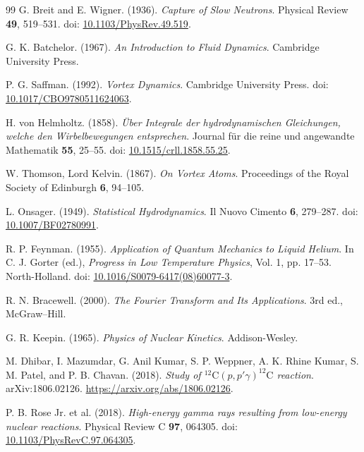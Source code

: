 \begin{thebibliography}{99}
        G. Breit and E. Wigner. (1936).
        \textit{Capture of Slow Neutrons}.
        Physical Review \textbf{49}, 519--531.
        doi: \href{https://doi.org/10.1103/PhysRev.49.519}{10.1103/PhysRev.49.519}.
        
        G. K. Batchelor. (1967).
        \textit{An Introduction to Fluid Dynamics}.
        Cambridge University Press.
        
        P. G. Saffman. (1992).
        \textit{Vortex Dynamics}.
        Cambridge University Press.
        doi: \href{https://doi.org/10.1017/CBO9780511624063}{10.1017/CBO9780511624063}.
        
        H. von Helmholtz. (1858).
        \textit{\"Uber Integrale der hydrodynamischen Gleichungen, welche den Wirbelbewegungen entsprechen}.
        Journal f\"ur die reine und angewandte Mathematik \textbf{55}, 25--55.
        doi: \href{https://doi.org/10.1515/crll.1858.55.25}{10.1515/crll.1858.55.25}.
        
        W. Thomson, Lord Kelvin. (1867).
        \textit{On Vortex Atoms}.
        Proceedings of the Royal Society of Edinburgh \textbf{6}, 94--105.
        
        L. Onsager. (1949).
        \textit{Statistical Hydrodynamics}.
        Il Nuovo Cimento \textbf{6}, 279--287.
        doi: \href{https://doi.org/10.1007/BF02780991}{10.1007/BF02780991}.
        
        R. P. Feynman. (1955).
        \textit{Application of Quantum Mechanics to Liquid Helium}.
        In C. J. Gorter (ed.), \textit{Progress in Low Temperature Physics}, Vol. 1, pp. 17--53.
        North-Holland.
        doi: \href{https://doi.org/10.1016/S0079-6417(08)60077-3}{10.1016/S0079-6417(08)60077-3}.
        
        R. N. Bracewell. (2000).
        \textit{The Fourier Transform and Its Applications}.
        3rd ed., McGraw--Hill.
        
        G. R. Keepin. (1965).
        \textit{Physics of Nuclear Kinetics}.
        Addison-Wesley.
        
        M. Dhibar, I. Mazumdar, G. Anil Kumar, S. P. Weppner, A. K. Rhine Kumar, S. M. Patel, and P. B. Chavan. (2018).
        \textit{Study of \(^{12}\mathrm C(p,p'\gamma)^{12}\mathrm C\) reaction}.
        arXiv:1806.02126.
        \href{https://arxiv.org/abs/1806.02126}{https://arxiv.org/abs/1806.02126}.
        
        P. B. Rose Jr. et al. (2018).
        \textit{High-energy gamma rays resulting from low-energy nuclear reactions}.
        Physical Review C \textbf{97}, 064305.
        doi: \href{https://doi.org/10.1103/PhysRevC.97.064305}{10.1103/PhysRevC.97.064305}.
    
    \end{thebibliography}
\fi




